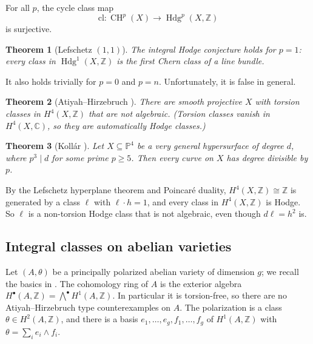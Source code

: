 \documentclass[12pt]{amsart}
\newcommand{\C}{\mathbb{C}}
\newcommand{\Z}{\mathbb{Z}}
\newcommand{\PP}{\mathbb{P}}
\DeclareMathOperator{\Hdg}{Hdg}
\DeclareMathOperator{\CH}{CH}
\let\oldbigwedge\bigwedge
\renewcommand{\bigwedge}{\mathop{\textstyle\oldbigwedge}\nolimits}
\newtheorem{theorem}{Theorem}[section]
\theoremstyle{definition}
\theoremstyle{remark}
\numberwithin{equation}{section}
\begin{document}
\begin{conjecture}
    For all $p$, the cycle class map
    \begin{equation*}
        \mathrm{cl} \colon \CH^p(X) \to \Hdg^p(X, \Z)
    \end{equation*}
    is surjective.
\end{conjecture}

\begin{theorem}[Lefschetz $(1,1)$]
    The integral Hodge conjecture holds for $p = 1$: every class in
    $\Hdg^1(X, \Z)$ is the first Chern class of a line bundle.
\end{theorem}

It also holds trivially for $p = 0$ and $p = n$. Unfortunately, it is false in
general.

\begin{theorem}[Atiyah--Hirzebruch \cite{AH62}]
    There are smooth projective $X$ with torsion classes in $H^4(X, \Z)$ that
    are not algebraic. (Torsion classes vanish in $H^4(X, \C)$, so they are
    automatically Hodge classes.)
\end{theorem}

\begin{theorem}[Koll\'ar \cite{Kollar92}]
    Let $X \subseteq \PP^4$ be a very general hypersurface of degree $d$, where
    $p^3 \mid d$ for some prime $p \geq 5$. Then every curve on $X$ has degree
    divisible by $p$.
\end{theorem}

By the Lefschetz hyperplane theorem and Poincar\'e duality,
$H^4(X, \Z) \cong \Z$ is generated by a class $\ell$ with $\ell \cdot h = 1$,
and every class in $H^4(X,\Z)$ is Hodge. So $\ell$ is a non-torsion Hodge class
that is not algebraic, even though $d \ell = h^2$ is.

\subsection{Integral classes on abelian varieties}\label{subsec:integral-AV}
Let $(A, \theta)$ be a principally polarized abelian variety of dimension $g$;
we recall the basics in . The cohomology ring of $A$ is the
exterior algebra $H^\bullet(A, \Z) = \bigwedge^\bullet H^1(A, \Z)$. In
particular it is torsion-free, so there are no Atiyah--Hirzebruch type
counterexamples on $A$. The polarization is a class $\theta \in H^2(A, \Z)$,
and there is a basis $e_1, \ldots, e_g, f_1, \ldots, f_g$ of $H^1(A, \Z)$ with
$\theta = \sum_i e_i \wedge f_i$.
\end{document}
